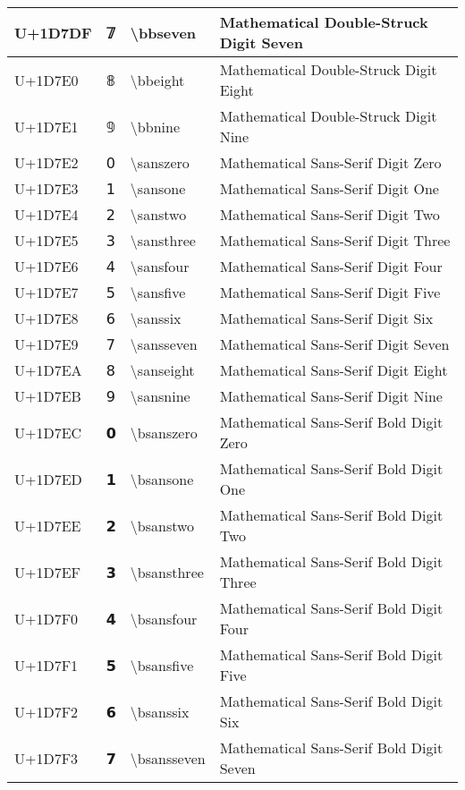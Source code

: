\begin{table}[h]
\begin{tabulary}{\linewidth}{|L|L|L|L|}
U+1D7DF & 𝟟 & {\textbackslash}bbseven & Mathematical Double-Struck Digit Seven \\
\hline
U+1D7E0 & 𝟠 & {\textbackslash}bbeight & Mathematical Double-Struck Digit Eight \\
\hline
U+1D7E1 & 𝟡 & {\textbackslash}bbnine & Mathematical Double-Struck Digit Nine \\
\hline
U+1D7E2 & 𝟢 & {\textbackslash}sanszero & Mathematical Sans-Serif Digit Zero \\
\hline
U+1D7E3 & 𝟣 & {\textbackslash}sansone & Mathematical Sans-Serif Digit One \\
\hline
U+1D7E4 & 𝟤 & {\textbackslash}sanstwo & Mathematical Sans-Serif Digit Two \\
\hline
U+1D7E5 & 𝟥 & {\textbackslash}sansthree & Mathematical Sans-Serif Digit Three \\
\hline
U+1D7E6 & 𝟦 & {\textbackslash}sansfour & Mathematical Sans-Serif Digit Four \\
\hline
U+1D7E7 & 𝟧 & {\textbackslash}sansfive & Mathematical Sans-Serif Digit Five \\
\hline
U+1D7E8 & 𝟨 & {\textbackslash}sanssix & Mathematical Sans-Serif Digit Six \\
\hline
U+1D7E9 & 𝟩 & {\textbackslash}sansseven & Mathematical Sans-Serif Digit Seven \\
\hline
U+1D7EA & 𝟪 & {\textbackslash}sanseight & Mathematical Sans-Serif Digit Eight \\
\hline
U+1D7EB & 𝟫 & {\textbackslash}sansnine & Mathematical Sans-Serif Digit Nine \\
\hline
U+1D7EC & 𝟬 & {\textbackslash}bsanszero & Mathematical Sans-Serif Bold Digit Zero \\
\hline
U+1D7ED & 𝟭 & {\textbackslash}bsansone & Mathematical Sans-Serif Bold Digit One \\
\hline
U+1D7EE & 𝟮 & {\textbackslash}bsanstwo & Mathematical Sans-Serif Bold Digit Two \\
\hline
U+1D7EF & 𝟯 & {\textbackslash}bsansthree & Mathematical Sans-Serif Bold Digit Three \\
\hline
U+1D7F0 & 𝟰 & {\textbackslash}bsansfour & Mathematical Sans-Serif Bold Digit Four \\
\hline
U+1D7F1 & 𝟱 & {\textbackslash}bsansfive & Mathematical Sans-Serif Bold Digit Five \\
\hline
U+1D7F2 & 𝟲 & {\textbackslash}bsanssix & Mathematical Sans-Serif Bold Digit Six \\
\hline
U+1D7F3 & 𝟳 & {\textbackslash}bsansseven & Mathematical Sans-Serif Bold Digit Seven \\

\end{tabulary}
\end{table}
